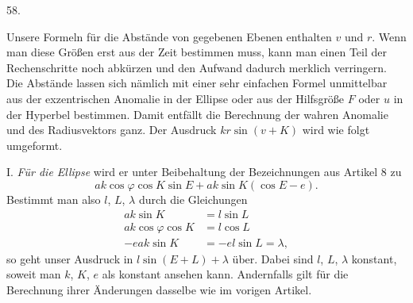 \par{}\medskip
\hypertarget{native-076-article058}{}
\begin{center}58.\end{center}
Unsere Formeln für die Abstände von gegebenen Ebenen enthalten $v$ und $r$. Wenn man diese Größen erst aus der Zeit bestimmen muss, kann man einen Teil der Rechenschritte noch abkürzen und den Aufwand dadurch merklich verringern. Die Abstände lassen sich nämlich mit einer sehr einfachen Formel unmittelbar aus der exzentrischen Anomalie in der Ellipse oder aus der Hilfsgröße $F$ oder $u$ in der Hyperbel bestimmen. Damit entfällt die Berechnung der wahren Anomalie und des Radiusvektors ganz. Der Ausdruck $kr\sin(v+K)$ wird wie folgt umgeformt.

I. \textit{Für die Ellipse} wird er unter Beibehaltung der Bezeichnungen aus Artikel 8 zu
\[
ak\cos\varphi\cos K\sin E+ak\sin K(\cos E-e).
\]
Bestimmt man also $l$, $L$, $\lambda$ durch die Gleichungen
\[
\begin{aligned}
ak\sin K&=l\sin L\\
ak\cos\varphi\cos K&=l\cos L\\
-eak\sin K&=-el\sin L=\lambda,
\end{aligned}
\]
so geht unser Ausdruck in $l\sin(E+L)+\lambda$ über. Dabei sind $l$, $L$, $\lambda$ konstant, soweit man $k$, $K$, $e$ als konstant ansehen kann. Andernfalls gilt für die Berechnung ihrer Änderungen dasselbe wie im vorigen Artikel.

